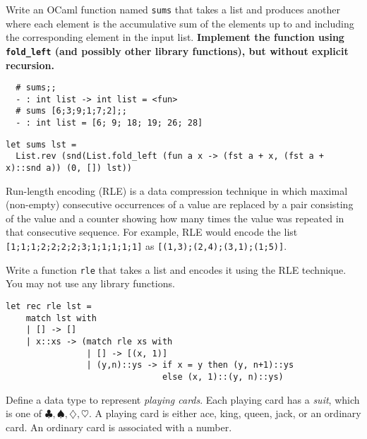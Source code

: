 \documentclass[addpoints]{exam}
\begin{document}
\begin{questions}
  
  \question
  Write an OCaml function named \texttt{sums}
  that takes a list and produces another where
  each element is the accumulative
  sum of the elements up to and including the corresponding element in the input list.
  \textbf{Implement the function using \texttt{fold\_left} (and possibly
  other library functions), but without explicit recursion.}

  \begin{verbatim}
  # sums;;
  - : int list -> int list = <fun>
  # sums [6;3;9;1;7;2];;
  - : int list = [6; 9; 18; 19; 26; 28]
  \end{verbatim}
  
  \begin{solutionbox}{2cm}
    \begin{verbatim}
let sums lst =
  List.rev (snd(List.fold_left (fun a x -> (fst a + x, (fst a + x)::snd a)) (0, []) lst))
    \end{verbatim}
  \end{solutionbox}

  \question
  Run-length encoding (RLE) is a data compression technique
  in which maximal (non-empty) consecutive
  occurrences of a value are replaced by a pair consisting
  of the value and a counter showing how many times
  the value was repeated in that consecutive sequence.
  For example, RLE would encode the list
  \texttt{[1;1;1;2;2;2;2;3;1;1;1;1;1]}
  as \texttt{[(1,3);(2,4);(3,1);(1;5)]}.

  Write a function \texttt{rle} that takes a list
  and encodes it using the RLE technique.
  You may not use any library functions.

  \begin{solutionbox}{4cm}
    \begin{verbatim}
let rec rle lst =
    match lst with
    | [] -> []
    | x::xs -> (match rle xs with
                | [] -> [(x, 1)]
                | (y,n)::ys -> if x = y then (y, n+1)::ys
                               else (x, 1)::(y, n)::ys)
    \end{verbatim}
  \end{solutionbox}


  
  
  \question
  Define a data type to represent \emph{playing cards}.
  Each playing card has a \emph{suit}, which is one of
  $\clubsuit, \spadesuit, \diamondsuit, \heartsuit$.
  A playing card is either ace, king, queen, jack, or an ordinary card.
  An ordinary card is associated with a number.


\end{questions}
\end{document}
